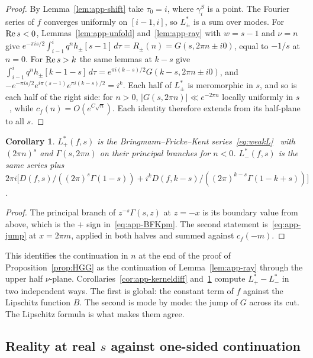 \documentclass[11pt]{article}
\newtheorem{corollary}[theorem]{Corollary}
\begin{document}
\begin{proof}
By Lemma~\ref{lem:app-shift} take $\tau_0=i$, where $\gamma^S_i$ is a point. The Fourier series of
$f$ converges uniformly on $[i-1,i]$, so $L^*_\pm$ is a sum over modes. For ${\rm Re}\,s<0$,
Lemmas~\ref{lem:app-unfold} and~\ref{lem:app-ray} with $w=s-1$ and $\nu=n$ give
$e^{-\pi is/2}\int_{i-1}^{i}q^n h_\pm[s-1]\,d\tau=R_\pm(n)=G(s,2\pi n\pm i0)$, equal to $-1/s$ at
$n=0$. For ${\rm Re}\,s>k$ the same lemmas at $k-s$ give
$\int_{i-1}^{i}q^n h_\pm[k-1-s]\,d\tau=e^{\pi i(k-s)/2}G(k-s,2\pi n\pm i0)$, and
$-e^{-\pi is/2}e^{i\pi(s-1)}e^{\pi i(k-s)/2}=i^k$. Each half of $L^*_\pm$ is meromorphic in $s$, and
so is each half of the right side: for $n>0$, $|G(s,2\pi n)|\ll e^{-2\pi n}$ locally uniformly in
$s$~\cite[\S8.11]{DLMF}, while $c_f(n)=O(e^{C\sqrt n})$. Each identity therefore extends from its
half-plane to all $s$.
\end{proof}

\begin{corollary}\label{cor:app-BFK}
$L^*_+(f,s)$ is the Bringmann--Fricke--Kent series~\eqref{eq:weakL}~\cite{BFK2011} with
$(2\pi n)^s$ and $\Gamma(s,2\pi n)$ on their principal branches for $n<0$. $L^*_-(f,s)$ is the same
series plus
$2\pi i\big[D(f,s)/((2\pi)^s\Gamma(1-s))+i^kD(f,k-s)/((2\pi)^{k-s}\Gamma(1-k+s))\big]$.
\end{corollary}

\begin{proof}
The principal branch of $z^{-s}\Gamma(s,z)$ at $z=-x$ is its boundary value from above, which is
the $+$ sign in~\eqref{eq:app-BFKpm}. The second statement is~\eqref{eq:app-jump} at $x=2\pi m$,
applied in both halves and summed against $c_f(-m)$.
\end{proof}

This identifies the continuation in $n$ at the end of the proof of Proposition~\ref{prop:HGG} as
the continuation of Lemma~\ref{lem:app-ray} through the upper half $\nu$-plane.
Corollaries~\ref{cor:app-kerneldiff} and~\ref{cor:app-BFK} compute $L^*_+-L^*_-$ in two independent
ways. The first is global: the constant term of $f$ against the Lipschitz function $B$. The second
is mode by mode: the jump of $G$ across its cut. The Lipschitz formula is what makes them agree.

\subsection{Reality at real $s$ against one-sided continuation}
\end{document}
